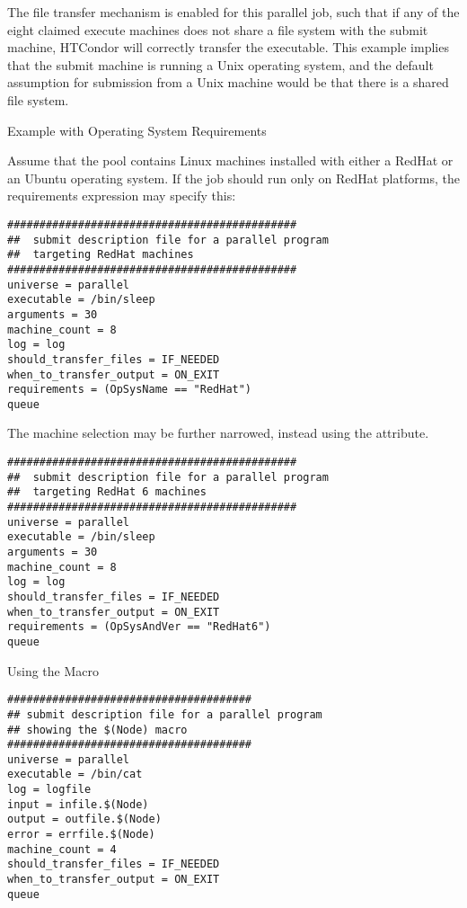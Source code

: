 The file transfer mechanism is enabled for this parallel job,
such that if any of the eight claimed execute machines does not
share a file system with the submit machine, 
HTCondor will correctly transfer the executable. 
This  example implies that the submit machine
is running a Unix operating system,
and the default assumption for submission from a Unix machine
would be that there is a shared file system.

\begin{description}
\item[Example with Operating System Requirements]
\end{description}

Assume that the pool contains
Linux machines installed with either a RedHat or an Ubuntu operating system.
If the job should run only on RedHat platforms,
the requirements expression may specify this:

\footnotesize
\begin{verbatim}
#############################################
##  submit description file for a parallel program
##  targeting RedHat machines
#############################################
universe = parallel
executable = /bin/sleep
arguments = 30
machine_count = 8
log = log
should_transfer_files = IF_NEEDED
when_to_transfer_output = ON_EXIT
requirements = (OpSysName == "RedHat")
queue 
\end{verbatim}
\normalsize

The machine selection may be further narrowed, instead using the
 attribute.

\footnotesize
\begin{verbatim}
#############################################
##  submit description file for a parallel program 
##  targeting RedHat 6 machines
#############################################
universe = parallel
executable = /bin/sleep
arguments = 30
machine_count = 8
log = log
should_transfer_files = IF_NEEDED
when_to_transfer_output = ON_EXIT
requirements = (OpSysAndVer == "RedHat6")
queue
\end{verbatim}
\normalsize

\begin{description}
\item[Using the  Macro]
\end{description}

\footnotesize
\begin{verbatim}
######################################
## submit description file for a parallel program
## showing the $(Node) macro
######################################
universe = parallel
executable = /bin/cat
log = logfile
input = infile.$(Node)
output = outfile.$(Node)
error = errfile.$(Node)
machine_count = 4
should_transfer_files = IF_NEEDED
when_to_transfer_output = ON_EXIT
queue
\end{verbatim}
\normalsize

